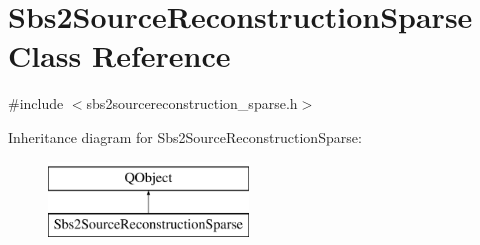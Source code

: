 \hypertarget{classSbs2SourceReconstructionSparse}{\section{Sbs2\-Source\-Reconstruction\-Sparse Class Reference}
\label{classSbs2SourceReconstructionSparse}
}


{\ttfamily \#include $<$sbs2sourcereconstruction\-\_\-sparse.\-h$>$}

Inheritance diagram for Sbs2\-Source\-Reconstruction\-Sparse\-:\begin{figure}[H]
\begin{center}
\leavevmode
\includegraphics[height=2.000000cm]{classSbs2SourceReconstructionSparse}
\end{center}
\end{figure}
